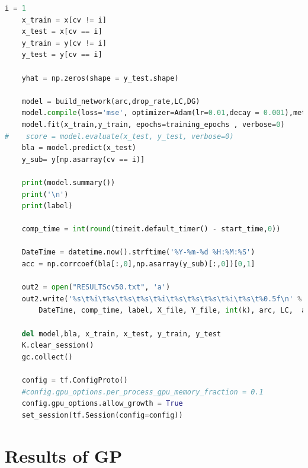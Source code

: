 \begin{lstlisting}[language=Python]
    i = 1
    x_train = x[cv != i] 
    x_test = x[cv == i] 
    y_train = y[cv != i]
    y_test = y[cv == i]

    yhat = np.zeros(shape = y_test.shape)

    model = build_network(arc,drop_rate,LC,DG)
    model.compile(loss='mse', optimizer=Adam(lr=0.01,decay = 0.001),metrics=['accuracy'])
    model.fit(x_train,y_train, epochs=training_epochs , verbose=0) 
#    score = model.evaluate(x_test, y_test, verbose=0)
    bla = model.predict(x_test)
    y_sub= y[np.asarray(cv == i)]
    
    print(model.summary())
    print('\n')
    print(label)        

    comp_time = int(round(timeit.default_timer() - start_time,0))

    DateTime = datetime.now().strftime('%Y-%m-%d %H:%M:%S')
    acc = np.corrcoef(bla[:,0],np.asarray(y_sub)[:,0])[0,1]

    out2 = open("RESULTScv50.txt", 'a')
    out2.write('%s\t%i\t%s\t%s\t%s\t%i\t%s\t%s\t%s\t%i\t%s\t%0.5f\n' % (
        DateTime, comp_time, label, X_file, Y_file, int(k), arc, LC,  act,int(training_epochs), drop_rate, round(acc,4)))

    del model,bla, x_train, x_test, y_train, y_test 
    K.clear_session() 
    gc.collect()
    
    config = tf.ConfigProto()
    #config.gpu_options.per_process_gpu_memory_fraction = 0.1
    config.gpu_options.allow_growth = True
    set_session(tf.Session(config=config))
  \end{lstlisting}

  \section{Results of GP} \label{AC:gp_res}

